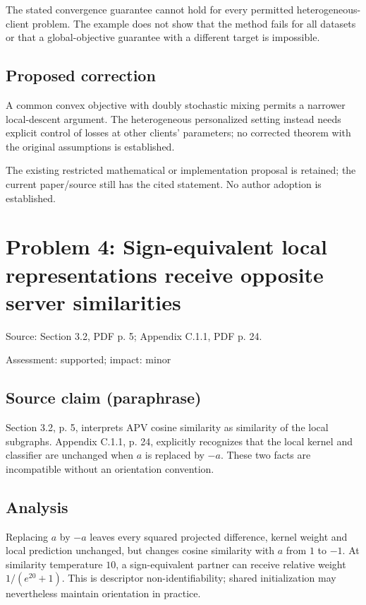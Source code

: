 \documentclass[11pt]{article}
\begin{document}
The stated convergence guarantee cannot hold for every permitted heterogeneous-client problem. The example does not show that the method fails for all datasets or that a global-objective guarantee with a different target is impossible.

\subsection*{Proposed correction}

A common convex objective with doubly stochastic mixing permits a narrower local-descent argument. The heterogeneous personalized setting instead needs explicit control of losses at other clients’ parameters; no corrected theorem with the original assumptions is established.

The existing restricted mathematical or implementation proposal is retained; the current paper/source still has the cited statement. No author adoption is established.

\section*{Problem 4: Sign-equivalent local representations receive opposite server similarities}

Source: Section 3.2, PDF p. 5; Appendix C.1.1, PDF p. 24.

Assessment: supported; impact: minor

\subsection*{Source claim (paraphrase)}

Section 3.2, p. 5, interprets APV cosine similarity as similarity of the local subgraphs. Appendix C.1.1, p. 24, explicitly recognizes that the local kernel and classifier are unchanged when \(a\) is replaced by \(-a\). These two facts are incompatible without an orientation convention.

\subsection*{Analysis}

Replacing \(a\) by \(-a\) leaves every squared projected difference, kernel weight and local prediction unchanged, but changes cosine similarity with \(a\) from \(1\) to \(-1\). At similarity temperature \(10\), a sign-equivalent partner can receive relative weight \(1/(e^{20}+1)\). This is descriptor non-identifiability; shared initialization may nevertheless maintain orientation in practice.
\end{document}
